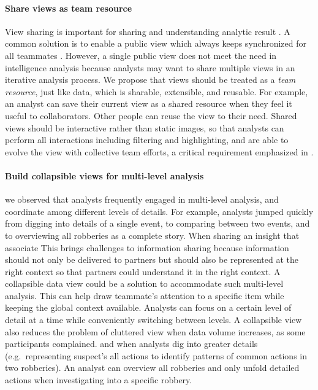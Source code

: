 \paragraph{Share views as team resource}

View sharing is important for sharing and understanding analytic result \cite{Morton2014a}. A common solution is to enable a public view which always keeps synchronized for all teammates \cite{Convertino2011,Greenberg1990}. However, a single public view does not meet the need in intelligence analysis because analysts may want to share multiple views in an iterative analysis process.
We propose that views should be treated as a
\emph{team resource}, just like data, which is sharable,
extensible, and reusable. For example, an analyst can save their current view as a shared resource when
they feel it useful to collaborators. Other people can reuse the view
to their need. Shared views should be interactive rather than static
images, so that analysts can perform all interactions including
filtering and highlighting, and are able to evolve the view with
collective team efforts, a critical requirement emphasized in
\cite{Carroll2013}.


\paragraph{Build collapsible views for multi-level analysis}

we observed that analysts
frequently engaged in multi-level analysis,
and coordinate among different levels of details. For example, analysts jumped quickly from digging into details of a single event, to
comparing between two events, and to overviewing all robberies as a
complete story. When sharing an insight that associate This brings challenges to information sharing because information should not only be delivered to partners but should also be represented at the right context so that partners could understand it in the right context. A collapsible data view could be a solution to accommodate such multi-level analysis. This can help draw teammate's attention to a specific item while keeping the global context available. Analysts can focus on a certain level of
detail at a time while conveniently switching between levels. A collapsible view also reduces the problem of cluttered view when data volume increases, as some participants complained.  and when analysts
dig into greater details (e.g.~representing suspect's all actions to
identify patterns of common actions in two robberies). An analyst can overview all robberies and only unfold detailed actions when investigating into a specific robbery.
